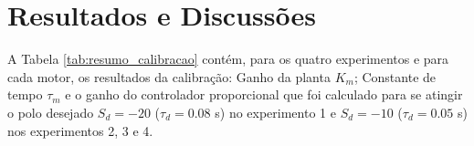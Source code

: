 \chapter[Resultados]{Resultados e Discussões}
\label{ch:resultados}






A Tabela \ref{tab:resumo_calibracao} contém, para os quatro experimentos e para cada motor, os resultados da calibração: Ganho da planta $K_m$; Constante de tempo $\tau_m$ e o ganho do controlador proporcional que foi calculado para se atingir o polo desejado $S_d = -20$ ($\tau_{d} = 0.08$ s) no experimento 1 e $S_d = -10$ ($\tau_{d} = 0.05$ s) nos experimentos 2, 3 e 4.

